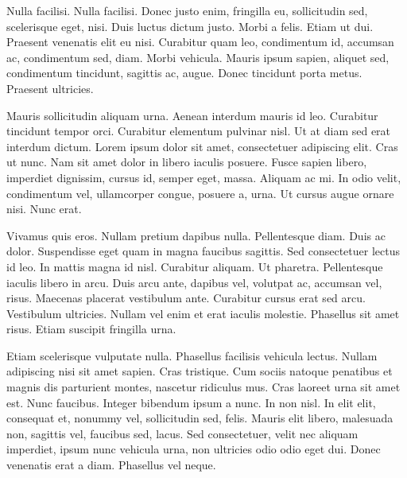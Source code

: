 \documentclass[printmode]{mgr}
\begin{document}
Nulla facilisi. Nulla facilisi. Donec justo enim, fringilla eu,
sollicitudin sed, scelerisque eget, nisi. Duis luctus dictum
justo. Morbi a felis. Etiam ut dui. Praesent venenatis elit eu
nisi. Curabitur quam leo, condimentum id, accumsan ac, condimentum
sed, diam. Morbi vehicula. Mauris ipsum sapien, aliquet sed,
condimentum tincidunt, sagittis ac, augue. Donec tincidunt porta
metus. Praesent ultricies.

Mauris sollicitudin aliquam urna. Aenean interdum mauris id
leo. Curabitur tincidunt tempor orci. Curabitur elementum pulvinar
nisl. Ut at diam sed erat interdum dictum. Lorem ipsum dolor sit amet,
consectetuer adipiscing elit. Cras ut nunc. Nam sit amet dolor in
libero iaculis posuere. Fusce sapien libero, imperdiet dignissim,
cursus id, semper eget, massa. Aliquam ac mi. In odio velit,
condimentum vel, ullamcorper congue, posuere a, urna. Ut cursus augue
ornare nisi. Nunc erat.

Vivamus quis eros. Nullam pretium dapibus nulla. Pellentesque
diam. Duis ac dolor. Suspendisse eget quam in magna faucibus
sagittis. Sed consectetuer lectus id leo. In mattis magna id
nisl. Curabitur aliquam. Ut pharetra. Pellentesque iaculis libero in
arcu. Duis arcu ante, dapibus vel, volutpat ac, accumsan vel,
risus. Maecenas placerat vestibulum ante. Curabitur cursus erat sed
arcu. Vestibulum ultricies. Nullam vel enim et erat iaculis
molestie. Phasellus sit amet risus. Etiam suscipit fringilla urna.

Etiam scelerisque vulputate nulla. Phasellus facilisis vehicula
lectus. Nullam adipiscing nisi sit amet sapien. Cras tristique. Cum
sociis natoque penatibus et magnis dis parturient montes, nascetur
ridiculus mus. Cras laoreet urna sit amet est. Nunc faucibus. Integer
bibendum ipsum a nunc. In non nisl. In elit elit, consequat et,
nonummy vel, sollicitudin sed, felis. Mauris elit libero, malesuada
non, sagittis vel, faucibus sed, lacus. Sed consectetuer, velit nec
aliquam imperdiet, ipsum nunc vehicula urna, non ultricies odio odio
eget dui. Donec venenatis erat a diam. Phasellus vel neque.


\cleardoublepage %


\nocite{*}

\end{document}
